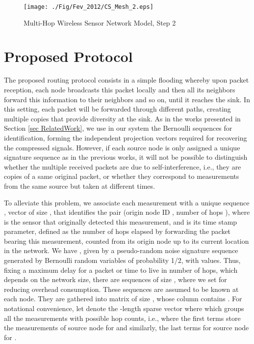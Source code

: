 \documentclass[letterpaper,conference]{IEEEtran}
\begin{document}
\begin{figure}[h]
\begin{center}
   \texttt{[image: ./Fig/Fev\_2012/CS\_Mesh\_2.eps]}
\caption{Multi-Hop Wireless Sensor Network Model, Step 2}
\label{fig:lattice}
\end{center}
\end{figure}




\section{Proposed Protocol}
\label{sec Algo}

The proposed routing protocol consists in a simple flooding whereby upon packet reception, each node broadcasts this packet locally and then all its neighbors forward this information to their neighbors and so on, until it reaches the sink. In this setting, each packet will be forwarded through different paths, creating multiple copies that provide diversity at the sink. As in the works presented in Section \ref{sec RelatedWork}, we use in our system the Bernoulli sequences for identification, forming the independent projection vectors required for recovering the compressed signals.
However, if each source node is only assigned a unique signature sequence as in the previous works, it will not be possible to distinguish whether the multiple received packets are due to self-interference, i.e., they are copies of a same original packet, or whether they correspond to measurements from the same source but taken at different times.

To alleviate this problem, we associate each measurement with a unique sequence , vector of size , that identifies the pair (origin node ID , number of hops ), where  is the sensor that originally detected this measurement, and  is its time stamp parameter, defined as the number of hops elapsed by forwarding the packet bearing this measurement, counted from its origin node up to its current location in the network.
We have , given by a pseudo-random noise signature sequence generated by Bernoulli random variables of probability 1/2, with  values. Thus, fixing a maximum delay for a packet or time to live  in number of hops, which depends on the network size, there are  sequences  of size , where we set  for reducing overhead consumption. These sequences are assumed to be known at each node.
They are gathered into matrix  of size , whose column  contains .
For notational convenience, let  denote the -length sparse vector where  which groups all the measurements with possible hop counts, i.e.,  where the  first terms store the measurements of source node  for  and similarly, the  last terms for source node  for .
\end{document}
